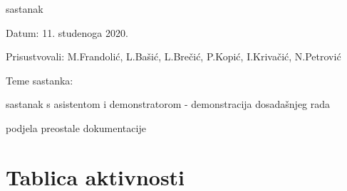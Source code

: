 \begin{packed_enum}
			\item sastanak
			\item[] \begin{packed_item}
				\item Datum: 11. studenoga 2020.
				\item Prisustvovali: M.Frandolić, L.Bašić, L.Brečić, P.Kopić, I.Krivačić, N.Petrović
				\item Teme sastanka:
				\begin{packed_item}
					\item sastanak s asistentom i demonstratorom - demonstracija dosadašnjeg rada
					\item podjela preostale dokumentacije
				\end{packed_item}
			\end{packed_item}
			
			
		\end{packed_enum}
		
		\eject
		\section*{Tablica aktivnosti}
			
